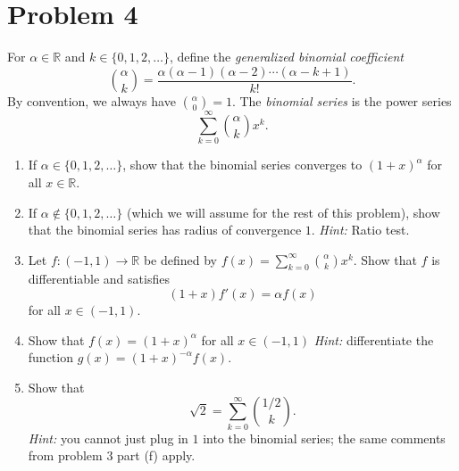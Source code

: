 \documentclass[11pt]{article}
\begin{document}
\section{Problem 4}
    For $\alpha \in \mathbb{R}$ and $k \in \{0, 1, 2, \dots\}$, define the \textit{generalized binomial coefficient}
    \begin{equation*}
        \binom{\alpha}{k} = \frac{\alpha(\alpha - 1)(\alpha - 2) \cdots (\alpha - k + 1)}{k!}.
    \end{equation*}
    By convention, we always have $\binom{\alpha}{0} = 1$. The \textit{binomial series} is the power series
    \begin{equation*}
        \sum_{k = 0}^{\infty} \binom{\alpha}{k} x^k.
    \end{equation*}
    \begin{enumerate}[label=(\alph*)]
        \item 
        If $\alpha \in \{0, 1, 2, \dots\}$, show that the binomial series converges to $(1 + x)^\alpha$ for all $x \in \mathbb{R}$.

        \item 
        If $\alpha \notin \{0, 1, 2, \dots\}$ (which we will assume for the rest of this problem), show that the binomial series has radius of convergence $1$. \textit{Hint:} Ratio test.

        \item 
        Let $f : (-1, 1) \to \mathbb{R}$ be defined by $f(x) = \sum_{k = 0}^{\infty} \binom{\alpha}{k} x^k$. Show that $f$ is differentiable and satisfies
        \begin{equation*}
            (1 + x)f'(x)  = \alpha f(x)
        \end{equation*}
        for all $x \in (-1, 1)$.
        
        \item 
        Show that $f(x) = (1 + x)^\alpha$ for all $x \in (-1, 1)$ \textit{Hint:} differentiate the function $g(x) = (1 + x)^{-\alpha}f(x)$.

        \item 
        Show that 
        \begin{equation*}
            \sqrt{2} = \sum_{k = 0}^{\infty} \binom{1/2}{k}.
        \end{equation*}
        \textit{Hint:}  you cannot just plug in $1$ into the binomial series; the same comments from problem 3 part (f) apply.
    \end{enumerate}
\end{document}
